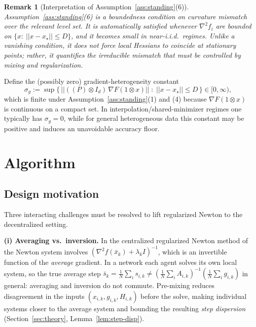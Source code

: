 \documentclass[11pt,a4paper]{article}
\def\one{1}%
\def\J{J}%
\def\Pmat{P}%
\def\norm#1{||#1||}%
\newtheorem{remark}[theorem]{Remark}
\newcommand{\one}{\mathbf{1}}
\newcommand{\norm}[1]{\left\|#1\right\|}
\newcommand{\J}{\left(\frac{1}{N}\one\one^\top\right)}
\newcommand{\Pmat}{I-\J}
\begin{document}
	\begin{remark}[Interpretation of Assumption~\ref{ass:standing}(6)]
		Assumption~\ref{ass:standing}(6) is a \emph{boundedness} condition on curvature mismatch over the relevant level set.
		It is automatically satisfied whenever $\nabla^2 f_i$ are bounded on $\{x:\ \norm{x-x_\star}\le D\}$, and it becomes small in near-i.i.d.\ regimes.
		Unlike a vanishing condition, it does \emph{not} force local Hessians to coincide at stationary points; rather, it quantifies the irreducible mismatch that must be controlled by mixing and regularization.
	\end{remark}
	
	Define the (possibly zero) gradient-heterogeneity constant
	\begin{equation}\label{eq:sigma_g_def}
		\sigma_g := \sup\Big\{\, \norm{((\Pmat)\otimes I_d)\,\nabla F(\one\otimes x)}\;:\; \norm{x-x_\star}\le D\,\Big\}\in[0,\infty),
	\end{equation}
	which is finite under Assumption~\ref{ass:standing}(1) and (4) because $\nabla F(\one\otimes x)$ is continuous on a compact set.
	In interpolation/shared-minimizer regimes one typically has $\sigma_g=0$, while for general heterogeneous data this constant may be positive and induces an unavoidable accuracy floor.
	
	
	\section{Algorithm}\label{sec:alg}
	
	\subsection{Design motivation}\label{ssec:design}
	
	Three interacting challenges must be resolved to lift regularized Newton to the decentralized setting.
	
	\textbf{(i) Averaging vs.\ inversion.}
	In the centralized regularized Newton method of \citet{mishchenko2023rn} the Newton system involves
	$(\nabla^2 f(\bar x_k)+\lambda_k I)^{-1}$, which is an invertible function of the \emph{average} gradient.
	In a network each agent solves its own local system, so the true average step
	$\bar s_k = \frac1N\sum_i s_{i,k} \ne (\frac1N\sum_i A_{i,k})^{-1}(\frac1N\sum_i g_{i,k})$
	in general: averaging and inversion do not commute.
	Pre-mixing reduces disagreement in the inputs $(x_{i,k}, g_{i,k}, H_{i,k})$ before the solve,
	making individual systems closer to the average system and bounding the resulting
	\emph{step dispersion} (Section~\ref{sec:theory}, Lemma~\ref{lem:step-disp}).
	
\end{document}
